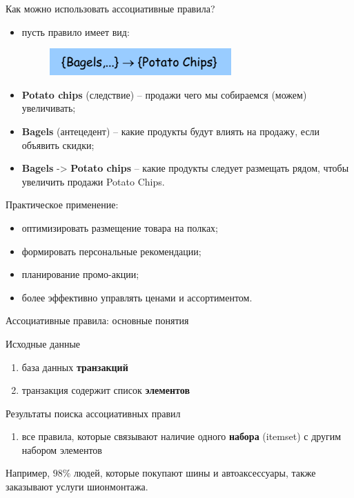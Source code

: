 \documentclass{beamer}
\begin{document}
\begin{frame}{Как можно использовать ассоциативные правила?}
	\begin{itemize}
		\item пусть правило имеет вид:
		\begin{figure}[h]
  			\centering
  			\includegraphics[scale=0.9]{images/lec08-pic03.png}
		\end{figure}
		\item \textbf{Potato chips} (следствие) -- продажи чего мы собираемся (можем) увеличивать;
		\item \textbf{Bagels} (антецедент) -- какие продукты будут влиять на продажу, если объявить скидки;
		\item \textbf{Bagels} -> \textbf{Potato chips} -- какие продукты следует размещать рядом, чтобы увеличить продажи Potato Chips.
	\end{itemize}

	Практическое применение:
	\begin{itemize}
		\item оптимизировать размещение товара на полках;
		\item формировать персональные рекомендации;
		\item планирование промо-акции;
		\item более эффективно управлять ценами и ассортиментом.
	\end{itemize}
\end{frame}

\begin{frame}{Ассоциативные правила: основные понятия}
	\begin{block}{Исходные данные}
		\begin{enumerate}
  			\item база данных \textbf{транзакций}
  			\item транзакция содержит список \textbf{элементов}
  		\end{enumerate}
	\end{block}
	\begin{block}{Результаты поиска ассоциативных правил}
  		\begin{enumerate}
  			\item все правила, которые связывают наличие одного \textbf{набора} (itemset) с другим набором элементов
		\end{enumerate}
	\end{block}
	
	Например, $98\%$ людей, которые покупают шины и автоаксессуары, также заказывают услуги шионмонтажа.
\end{frame}
\end{document}

